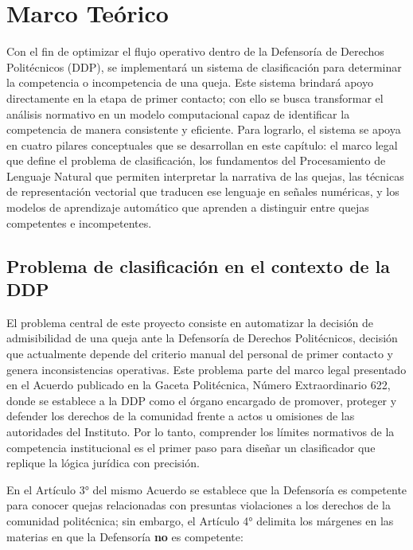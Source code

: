 \chapter{Marco Teórico}
\label{cap:marco_teorico}



Con el fin de optimizar el flujo operativo dentro de la Defensoría de Derechos
Politécnicos (DDP), se implementará un sistema de clasificación para determinar
la competencia o incompetencia de una queja. Este sistema brindará apoyo
directamente en la etapa de primer contacto; con ello se busca transformar el
análisis normativo en un modelo computacional capaz de identificar la competencia
de manera consistente y eficiente. Para lograrlo, el sistema se apoya en cuatro
pilares conceptuales que se desarrollan en este capítulo: el marco legal que
define el problema de clasificación, los fundamentos del Procesamiento de
Lenguaje Natural que permiten interpretar la narrativa de las quejas, las técnicas
de representación vectorial que traducen ese lenguaje en señales numéricas, y los
modelos de aprendizaje automático que aprenden a distinguir entre quejas
competentes e incompetentes.

\section{Problema de clasificación en el contexto de la DDP}

El problema central de este proyecto consiste en automatizar la decisión de
admisibilidad de una queja ante la Defensoría de Derechos Politécnicos, decisión
que actualmente depende del criterio manual del personal de primer contacto y
genera inconsistencias operativas. Este problema parte del marco legal presentado
en el Acuerdo publicado en la Gaceta Politécnica, Número Extraordinario 622,
donde se establece a la DDP como el órgano encargado de promover, proteger y
defender los derechos de la comunidad frente a actos u omisiones de las
autoridades del Instituto. Por lo tanto, comprender los límites normativos de la
competencia institucional es el primer paso para diseñar un clasificador que
replique la lógica jurídica con precisión.

En el Artículo 3° del mismo Acuerdo se establece que la Defensoría es competente
para conocer quejas relacionadas con presuntas violaciones a los derechos de la
comunidad politécnica; sin embargo, el Artículo 4° delimita los márgenes en las
materias en que la Defensoría \textbf{no} es competente:


